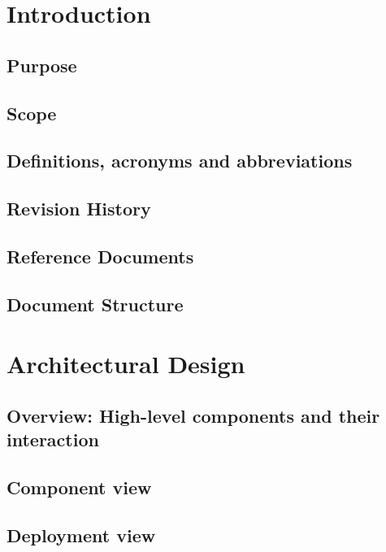   
  \tableofcontents
   
  \chapter{Introduction}
  \section{Purpose}
  
  \section{Scope}
  
  \section{Definitions, acronyms and abbreviations}
  
  \section{Revision History}
  
  \section{Reference Documents}
  
  \section{Document Structure}
  
  
  \chapter{Architectural Design}
  \section{Overview: High-level components and their interaction}
  
  \section{Component view}
  
  \section{Deployment view}
  
